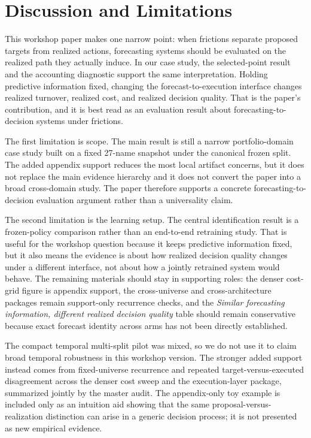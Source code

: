 \documentclass[10pt,twocolumn]{article}
\begin{document}
\section{Discussion and Limitations}

This workshop paper makes one narrow point: when frictions separate proposed targets from realized actions, forecasting systems should be evaluated on the realized path they actually induce. In our case study, the selected-point result and the accounting diagnostic support the same interpretation. Holding predictive information fixed, changing the forecast-to-execution interface changes realized turnover, realized cost, and realized decision quality. That is the paper's contribution, and it is best read as an evaluation result about forecasting-to-decision systems under frictions.

The first limitation is scope. The main result is still a narrow portfolio-domain case study built on a fixed 27-name snapshot under the canonical frozen split. The added appendix support reduces the most local artifact concerns, but it does not replace the main evidence hierarchy and it does not convert the paper into a broad cross-domain study. The paper therefore supports a concrete forecasting-to-decision evaluation argument rather than a universality claim.

The second limitation is the learning setup. The central identification result is a frozen-policy comparison rather than an end-to-end retraining study. That is useful for the workshop question because it keeps predictive information fixed, but it also means the evidence is about how realized decision quality changes under a different interface, not about how a jointly retrained system would behave. The remaining materials should stay in supporting roles: the denser cost-grid figure is appendix support, the cross-universe and cross-architecture packages remain support-only recurrence checks, and the \emph{Similar forecasting information, different realized decision quality} table should remain conservative because exact forecast identity across arms has not been directly established.

The compact temporal multi-split pilot was mixed, so we do not use it to claim broad temporal robustness in this workshop version. The stronger added support instead comes from fixed-universe recurrence and repeated target-versus-executed disagreement across the denser cost sweep and the execution-layer package, summarized jointly by the master audit. The appendix-only toy example is included only as an intuition aid showing that the same proposal-versus-realization distinction can arise in a generic decision process; it is not presented as new empirical evidence.
\end{document}
